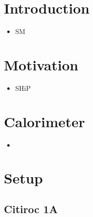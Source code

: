 \chapter{Introduction}

\begin{itemize}
    \item SM
    \itme 
\end{itemize}




\chapter{Motivation}

\begin{itemize}
    \item SHiP
    \itme 
\end{itemize}



\chapter{Calorimeter}

\begin{itemize}
    \item 
\end{itemize}



\chapter{Setup}

\section{Citiroc 1A}

